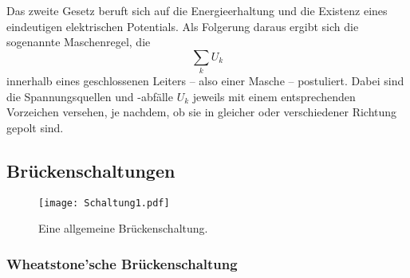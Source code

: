 Das zweite Gesetz beruft sich auf die Energieerhaltung und die Existenz eines eindeutigen elektrischen Potentials. 
Als Folgerung daraus ergibt sich die sogenannte Maschenregel, die 
\begin{equation}
    \sum_k U_k
    \label{eqn:kirchhoff2}
\end{equation}
innerhalb eines geschlossenen Leiters -- also einer Masche -- postuliert. 
Dabei sind die Spannungsquellen und -abfälle $U_k$ jeweils mit einem entsprechenden Vorzeichen versehen, je nachdem, ob sie 
in gleicher oder verschiedener Richtung gepolt sind. 

\subsection{Brückenschaltungen}
\begin{figure}
    \centering
    \texttt{[image: Schaltung1.pdf]}
    \caption{Eine allgemeine Brückenschaltung.}
    \label{fig:allg_schalt}
\end{figure}

\subsubsection{Wheatstone'sche Brückenschaltung}